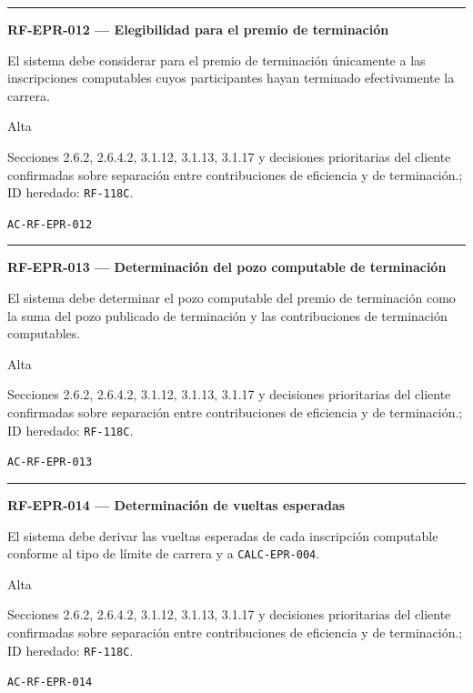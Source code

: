\documentclass[10pt,letterpaper]{article}
\begin{document}
\vspace{0.25em}\hrule\vspace{0.65em}
\noindent\textbf{RF-EPR-012 --- Elegibilidad para el premio de terminación}\par
\begin{description}[style=nextline,leftmargin=3.15cm,labelwidth=2.8cm,font=\normalfont\bfseries]
\item[Obligación] El sistema debe considerar para el premio de terminación únicamente a las inscripciones computables cuyos participantes hayan terminado efectivamente la carrera.
\item[Prioridad] Alta
\item[Procedencia] Secciones 2.6.2, 2.6.4.2, 3.1.12, 3.1.13, 3.1.17 y decisiones prioritarias del cliente confirmadas sobre separación entre contribuciones de eficiencia y de terminación.; ID heredado: \texttt{RF-118C}.
\item[Verificación] \texttt{AC-RF-EPR-012}
\end{description}
\vspace{0.25em}\hrule\vspace{0.65em}
\noindent\textbf{RF-EPR-013 --- Determinación del pozo computable de terminación}\par
\begin{description}[style=nextline,leftmargin=3.15cm,labelwidth=2.8cm,font=\normalfont\bfseries]
\item[Obligación] El sistema debe determinar el pozo computable del premio de terminación como la suma del pozo publicado de terminación y las contribuciones de terminación computables.
\item[Prioridad] Alta
\item[Procedencia] Secciones 2.6.2, 2.6.4.2, 3.1.12, 3.1.13, 3.1.17 y decisiones prioritarias del cliente confirmadas sobre separación entre contribuciones de eficiencia y de terminación.; ID heredado: \texttt{RF-118C}.
\item[Verificación] \texttt{AC-RF-EPR-013}
\end{description}
\vspace{0.25em}\hrule\vspace{0.65em}
\noindent\textbf{RF-EPR-014 --- Determinación de vueltas esperadas}\par
\begin{description}[style=nextline,leftmargin=3.15cm,labelwidth=2.8cm,font=\normalfont\bfseries]
\item[Obligación] El sistema debe derivar las vueltas esperadas de cada inscripción computable conforme al tipo de límite de carrera y a \texttt{CALC-EPR-004}.
\item[Prioridad] Alta
\item[Procedencia] Secciones 2.6.2, 2.6.4.2, 3.1.12, 3.1.13, 3.1.17 y decisiones prioritarias del cliente confirmadas sobre separación entre contribuciones de eficiencia y de terminación.; ID heredado: \texttt{RF-118C}.
\item[Verificación] \texttt{AC-RF-EPR-014}
\end{description}
\end{document}

